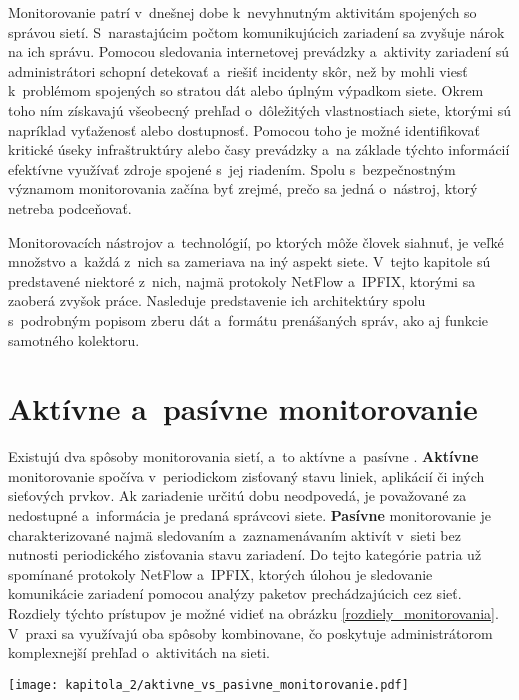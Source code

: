Monitorovanie patrí v~dnešnej dobe k~nevyhnutným aktivitám spojených so správou sietí. S~narastajúcim počtom komunikujúcich zariadení sa zvyšuje nárok na ich správu. Pomocou sledovania internetovej prevádzky a~aktivity zariadení
sú administrátori schopní detekovať a~riešiť incidenty skôr, než by mohli viesť k~problémom spojených so stratou dát alebo úplným výpadkom siete. Okrem toho ním získavajú všeobecný prehľad o~dôležitých vlastnostiach siete, ktorými sú napríklad
vyťaženosť alebo dostupnosť. Pomocou toho je možné identifikovať kritické úseky infraštruktúry alebo časy prevádzky a~na základe týchto informácií efektívne využívať zdroje spojené s~jej riadením. Spolu s~bezpečnostným významom monitorovania začína byť zrejmé,
prečo sa jedná o~nástroj, ktorý netreba podceňovať.

Monitorovacích nástrojov a~technológií, po ktorých môže človek siahnuť, je veľké množstvo a~každá z~nich sa zameriava na iný aspekt siete. V~tejto kapitole sú predstavené niektoré z~nich, najmä protokoly NetFlow a~IPFIX, ktorými sa zaoberá zvyšok práce.
Nasleduje predstavenie ich architektúry spolu s~podrobným popisom zberu dát a~formátu prenášaných správ, ako aj funkcie samotného kolektoru.

\section{Aktívne a~pasívne monitorovanie}
Existujú dva spôsoby monitorovania sietí, a~to aktívne a~pasívne \cite{matousek}. \textbf{Aktívne} monitorovanie spočíva v~periodickom zisťovaný stavu liniek, aplikácií či iných sieťových prvkov. Ak zariadenie určitú dobu neodpovedá, je považované za nedostupné a~informácia
je predaná správcovi siete. \textbf{Pasívne} monitorovanie je charakterizované najmä sledovaním a~zaznamenávaním aktivít v~sieti bez nutnosti periodického zisťovania stavu zariadení. Do tejto kategórie patria už spomínané protokoly NetFlow a~IPFIX, ktorých úlohou je sledovanie
komunikácie zariadení pomocou analýzy paketov prechádzajúcich cez sieť. Rozdiely týchto prístupov je možné vidieť na obrázku \ref{rozdiely_monitorovania}. V~praxi sa využívajú oba spôsoby kombinovane, čo poskytuje administrátorom komplexnejší prehľad o~aktivitách na sieti.

\newpage

\begin{figure*}[ht]
    \centering
    \texttt{[image: kapitola\_2/aktivne\_vs\_pasivne\_monitorovanie.pdf]}
    \caption{Porovnanie spôsobov aktívneho a~pasívneho monitorovania sietí}
    \label{rozdiely_monitorovania}
\end{figure*}


